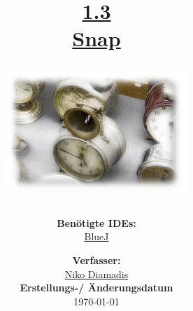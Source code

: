 \documentclass{scrartcl}   %
\begin{document}
\title{\huge{\href{https://www.inf-schule.de/programmierung/oopjava/klassen/kapselung}{1.3\\Snap}}\\
\vspace{0.5cm}
\begin{figure}[ht]
	\centering
	\includegraphics[height=4.5cm]{Snap.png}
\end{figure}
\vspace{2cm}}

\author{\textbf{Benötigte IDEs:}\\
\href{https://www.bluej.org/}{BlueJ}
\vspace{2cm}}

\date{\textbf{Verfasser:}\\
\href{https://nikothegreek.jimdofree.com/}{Niko Diamadis}\\
\vspace{0.5cm}
\textbf{Erstellungs-/ Änderungsdatum}\\
\today\enlargethispage{4cm}}

\doublespacing

\maketitle\thispagestyle{empty}

\cleardoublepage

\setcounter{page}{1}
\tableofcontents


\newpage
{}  %
\end{document}
